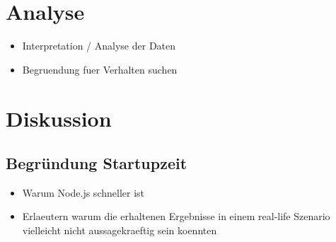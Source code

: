 \section{Analyse}
\begin{itemize}
  \item Interpretation / Analyse der Daten
  \item Begruendung fuer Verhalten suchen
\end{itemize}



\section{Diskussion}

\subsection{Begr\"undung Startupzeit}
\begin{itemize}
  \item Warum Node.js schneller ist
\end{itemize}

\begin{itemize}
  \item Erlaeutern warum die erhaltenen Ergebnisse in einem real-life Szenario vielleicht nicht aussagekraeftig sein koennten
\end{itemize}
